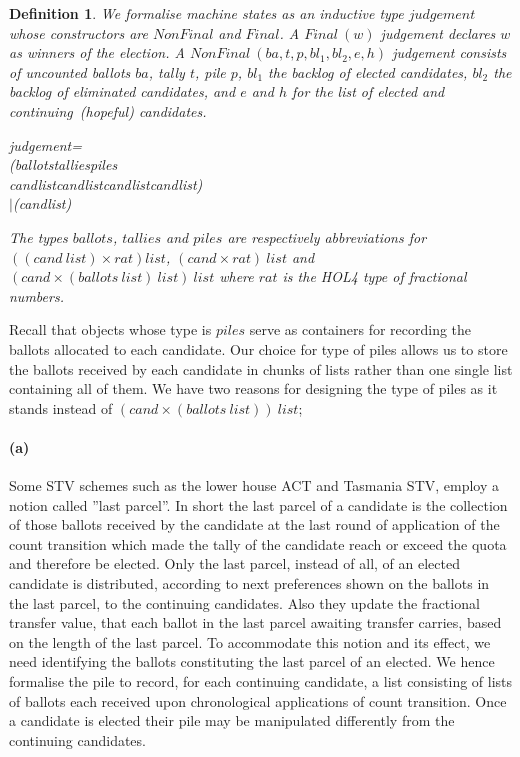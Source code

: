 \documentclass[10pt,conference]{IEEEtran}
\renewcommand{\HOLConst}[1]{{\textsf{\upshape #1}}}
\renewcommand{\HOLTyOp}[1]{\textsf{\itshape #1}}
\renewcommand{\HOLTokenBar}{\ensuremath{\mathtt{|}}}
\newtheorem{definition}{Definition}
\begin{document}
\begin{definition}\label{judgement}
We formalise machine states as an inductive type  $\mathit{judgement}$ whose constructors are  $\mathit{NonFinal}$ and $\mathit{Final}$. 
 A $\mathit{Final~(w)}$ judgement declares $w$ as winners of the election. A  $\mathit{NonFinal~(ba,t,p,bl_{1},bl_{2},e,h)}$ judgement  consists of uncounted ballots $ba$, tally $t$, pile $p$, $bl_{1}$ the backlog of elected candidates, $bl_{2}$ the backlog of eliminated candidates, and $e$ and $h$ for the list of elected and continuing~(hopeful) candidates. 
\begin{holthmenv}
\HOLTyOp{judgement}\;=\\
\;\;\;\;\HOLConst{NonFinal}\;(\HOLTyOp{ballots}\;\HOLTokenProd{}\;\HOLTyOp{tallies}\;\HOLTokenProd{}\;\HOLTyOp{piles}\;\HOLTokenProd{}\\\;\;\;\;\;\;\HOLTyOp{cand}\;\HOLTyOp{list}\;\HOLTokenProd{}\;\HOLTyOp{cand}\;\HOLTyOp{list}\;\HOLTokenProd{}\;\HOLTyOp{cand}\;\HOLTyOp{list}\;\HOLTokenProd{}\;\HOLTyOp{cand}\;\HOLTyOp{list})\\
\;\;\HOLTokenBar{}\;\HOLConst{Final}\;(\HOLTyOp{cand}\;\HOLTyOp{list})
\end{holthmenv} 
 The types  $\mathit{ballots}$, $\mathit{tallies}$ and $\mathit{piles}$ are respectively abbreviations for  $\mathit{((cand ~list)\times rat) list}$,   $\mathit{(cand\times rat)~list}$ and $\mathit{(cand\times(ballots~list)~list) ~list}$ where $\mathit{rat}$ is the HOL4 type of fractional numbers.
\end{definition}
 Recall that objects whose type is $\mathit{piles}$ serve as containers for recording the ballots allocated to each candidate. Our choice for type of piles allows us to store the ballots received by each candidate in chunks of lists rather than one single list containing all of them.  We have two reasons for designing the type of piles as it stands instead of $\mathit{(cand\times(ballots~list))~list}$;  
\paragraph*{(a)} Some STV schemes such as the lower house ACT and Tasmania STV, employ a notion called ''last parcel''. In short the last parcel of a candidate is the collection of those ballots received by the candidate at the last round of application of the count transition which made the tally of the candidate reach or exceed the quota and therefore be elected.  Only the last parcel, instead of all, of an elected candidate is distributed, according to next preferences shown on the ballots in the last parcel, to the continuing candidates.
 Also  they update the fractional transfer value, that each ballot in the last parcel  awaiting transfer carries, based on the length of the last parcel. To  accommodate this notion and its effect, we need identifying the ballots constituting the last parcel of an elected. We hence formalise the pile to record, for each  continuing candidate, a list consisting of lists of ballots each received upon  chronological applications of count transition.  Once a candidate is elected their pile may be manipulated differently from the continuing candidates. 
\end{document}
